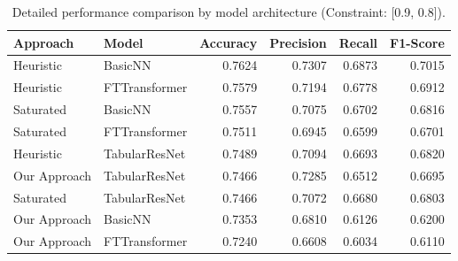 \begin{table}[htbp]
\caption{Detailed performance comparison by model architecture (Constraint: [0.9, 0.8]).}
\label{tab:detailed_results}
\begin{tabular}{llrrrr}
\toprule
Approach & Model & Accuracy & Precision & Recall & F1-Score \\
\midrule
Heuristic & BasicNN & 0.7624 & 0.7307 & 0.6873 & 0.7015 \\
Heuristic & FTTransformer & 0.7579 & 0.7194 & 0.6778 & 0.6912 \\
Saturated & BasicNN & 0.7557 & 0.7075 & 0.6702 & 0.6816 \\
Saturated & FTTransformer & 0.7511 & 0.6945 & 0.6599 & 0.6701 \\
Heuristic & TabularResNet & 0.7489 & 0.7094 & 0.6693 & 0.6820 \\
Our Approach & TabularResNet & 0.7466 & 0.7285 & 0.6512 & 0.6695 \\
Saturated & TabularResNet & 0.7466 & 0.7072 & 0.6680 & 0.6803 \\
Our Approach & BasicNN & 0.7353 & 0.6810 & 0.6126 & 0.6200 \\
Our Approach & FTTransformer & 0.7240 & 0.6608 & 0.6034 & 0.6110 \\
\bottomrule
\end{tabular}
\end{table}
